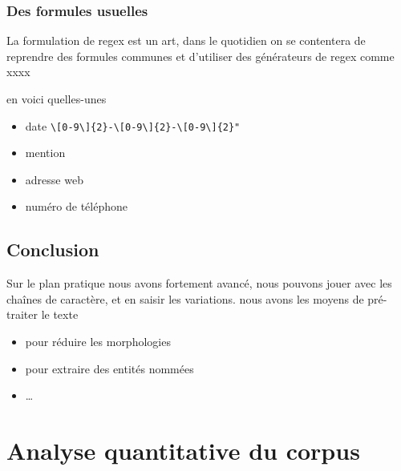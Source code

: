 \documentclass[
  letterpaper,
  DIV=11,
  numbers=noendperiod]{scrreprt}
\providecommand{\tightlist}{%
  \setlength{\itemsep}{0pt}\setlength{\parskip}{0pt}}\usepackage{longtable,booktabs,array}
\begin{document}
\subsection{Des formules usuelles}\label{des-formules-usuelles}

La formulation de regex est un art, dans le quotidien on se contentera
de reprendre des formules communes et d'utiliser des générateurs de
regex comme xxxx

en voici quelles-unes

\begin{itemize}
\item
  date
  \texttt{\textbackslash{}{[}0-9\textbackslash{}{]}\{2\}-\textbackslash{}{[}0-9\textbackslash{}{]}\{2\}-\textbackslash{}{[}0-9\textbackslash{}{]}\{2\}"}
\item
  mention
\item
  adresse web
\item
  numéro de téléphone
\end{itemize}

\section{Conclusion}\label{conclusion-3}

Sur le plan pratique nous avons fortement avancé, nous pouvons jouer
avec les chaînes de caractère, et en saisir les variations. nous avons
les moyens de pré-traiter le texte

\begin{itemize}
\tightlist
\item
  pour réduire les morphologies
\item
  pour extraire des entités nommées
\item
  \ldots{}
\end{itemize}


\chapter{Analyse quantitative du
corpus}\label{analyse-quantitative-du-corpus}
\end{document}
